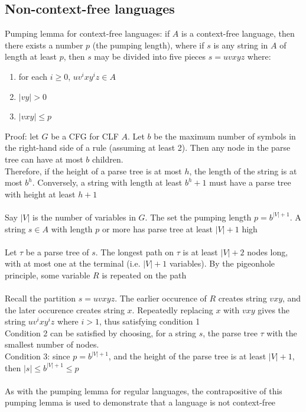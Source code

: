 \documentclass{article}
\newcommand*{\<}{\langle}
\renewcommand*{\>}{\rangle}
\begin{document}
		\subsection{Non-context-free languages}
			Pumping lemma for context-free languages: if $A$ is a context-free language, then there exists a number $p$ (the pumping length), where if $s$ is any string in $A$ of length at least $p$, then $s$ may be divided into five pieces $s = uvxyz$ where:
			\begin{enumerate}
				\item for each $i \geq 0$, $uv^ixy^iz \in A$
				\item $|vy| > 0$
				\item $|vxy| \leq p$
				\end{enumerate}
			Proof: let $G$ be a CFG for CLF $A$. Let $b$ be the maximum number of symbols in the right-hand side of a rule (assuming at least 2). Then any node in the parse tree can have at most $b$ children. \\
			Therefore, if the height of a parse tree is at most $h$, the length of the string is at most $b^h$. Conversely, a string with length at least $b^h + 1$ must have a parse tree with height at least $h + 1$ \\
			\\
			Say $|V|$ is the number of variables in $G$. The set the pumping length $p = b^{|V| + 1}$. A string $s \in A$ with length $p$ or more has parse tree at least $|V| + 1$ high \\
			\\
			Let $\tau$ be a parse tree of $s$. The longest path on $\tau$ is at least $|V| + 2$ nodes long, with at most one at the terminal (i.e. $|V| + 1$ variables). By the pigeonhole principle, some variable $R$ is repeated on the path \\
			\\
			Recall the partition $s = uvxyz$. The earlier occurence of $R$ creates string $vxy$, and the later occurence creates string $x$. Repeatedly replacing $x$ with $vxy$ gives the string $uv^ixy^iz$ where $i > 1$, thus satisfying condition 1 \\
			Condition 2 can be satisfied by choosing, for a string $s$, the parse tree $\tau$ with the smallest number of nodes. \\
			Condition 3: since $p = b^{|V| + 1}$, and the height of the parse tree is at least $|V| + 1$, then $|s| \leq b^{|V| + 1} \leq p$ \\
			\\
			As with the pumping lemma for regular languages, the contrapositive of this pumping lemma is used to demonstrate that a language is not context-free
		\clearpage
	
\end{document}
